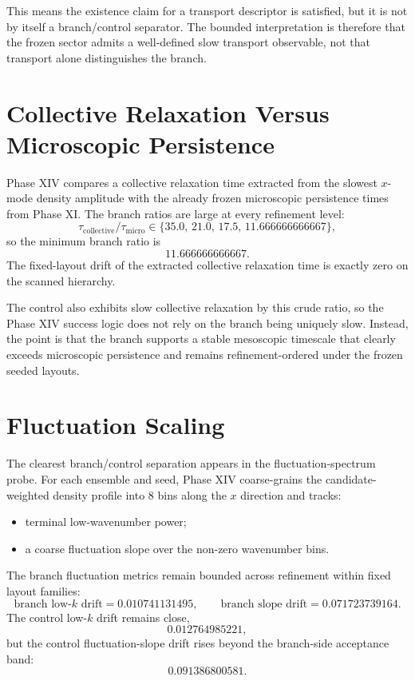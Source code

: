 \documentclass[11pt]{article}
\begin{document}
This means the existence claim for a transport descriptor is satisfied, but it is not by itself a branch/control separator. The bounded interpretation is therefore that the frozen sector admits a well-defined slow transport observable, not that transport alone distinguishes the branch.

\section{Collective Relaxation Versus Microscopic Persistence}

Phase XIV compares a collective relaxation time extracted from the slowest $x$-mode density amplitude with the already frozen microscopic persistence times from Phase XI. The branch ratios are large at every refinement level:
\[
\tau_{\mathrm{collective}}/\tau_{\mathrm{micro}}
\in \{35.0,\,21.0,\,17.5,\,11.666666666667\},
\]
so the minimum branch ratio is
\[
11.666666666667.
\]
The fixed-layout drift of the extracted collective relaxation time is exactly zero on the scanned hierarchy.

The control also exhibits slow collective relaxation by this crude ratio, so the Phase XIV success logic does not rely on the branch being uniquely slow. Instead, the point is that the branch supports a stable mesoscopic timescale that clearly exceeds microscopic persistence and remains refinement-ordered under the frozen seeded layouts.

\section{Fluctuation Scaling}

The clearest branch/control separation appears in the fluctuation-spectrum probe. For each ensemble and seed, Phase XIV coarse-grains the candidate-weighted density profile into $8$ bins along the $x$ direction and tracks:
\begin{itemize}
\item terminal low-wavenumber power;
\item a coarse fluctuation slope over the non-zero wavenumber bins.
\end{itemize}

The branch fluctuation metrics remain bounded across refinement within fixed layout families:
\[
\text{branch low-}k\text{ drift} = 0.010741131495,
\qquad
\text{branch slope drift} = 0.071723739164.
\]
The control low-$k$ drift remains close,
\[
0.012764985221,
\]
but the control fluctuation-slope drift rises beyond the branch-side acceptance band:
\[
0.091386800581.
\]
\end{document}
